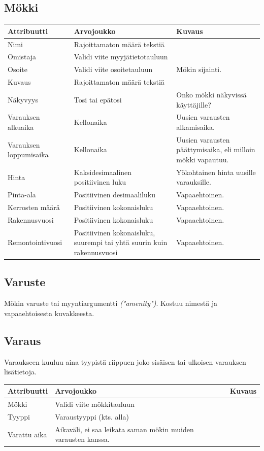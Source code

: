 \subsection{Mökki}
\begin{tabular}{| l | p{4cm} | p{5cm} |}
	\hline
	Attribuutti & Arvojoukko & Kuvaus \\ \hline
	Nimi & Rajoittamaton määrä tekstiä & \\ \hline
	Omistaja & Validi viite myyjätietotauluun & \\ \hline
	Osoite & Validi viite osoitetauluun & Mökin sijainti. \\ \hline
	Kuvaus & Rajoittamaton määrä tekstiä & \\ \hline
	Näkyvyys & Tosi tai epätosi & Onko mökki näkyvissä käyttäjille? \\ \hline
	Varauksen alkuaika & Kellonaika & Uusien varausten alkamisaika. \\ \hline
	Varauksen loppumisaika & Kellonaika & Uusien varausten päättymisaika, eli milloin mökki vapautuu. \\ \hline
	Hinta & Kaksidesimaalinen positiivinen luku & Yökohtainen hinta uusille varauksille. \\ \hline
	Pinta-ala & Positiivinen desimaaliluku & Vapaaehtoinen. \\ \hline
	Kerrosten määrä & Positiivinen kokonaisluku & Vapaaehtoinen. \\ \hline
	Rakennusvuosi & Positiivinen kokonaisluku & Vapaaehtoinen. \\ \hline
	Remontointivuosi & Positiivinen kokonaisluku, suurempi tai yhtä suurin kuin rakennusvuosi & Vapaaehtoinen. \\ \hline 
	
\end{tabular}


\subsection{Varuste}
Mökin varuste tai myyntiargumentti \textit{("amenity")}. Kostuu nimestä ja vapaaehtoisesta kuvakkeesta.

\subsection{Varaus}
Varaukseen kuuluu aina tyypistä riippuen joko sisäisen tai ulkoisen varauksen lisätietoja. \\

\begin{tabular}{| l | p{4cm} | p{5cm} |}
	\hline
	Attribuutti & Arvojoukko & Kuvaus \\ \hline
	Mökki & Validi viite mökkitauluun & \\ \hline
	Tyyppi & Varaustyyppi (kts. alla) & \\ \hline
	Varattu aika & Aikaväli, ei saa leikata saman mökin muiden varausten kanssa. & \\ \hline
\end{tabular}

